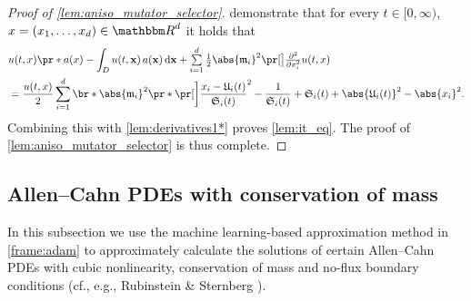 \begin{proof}[Proof of \cref{lem:aniso_mutator_selector}]
	demonstrate that 
		for every
			$t \in [0,\infty)$,
			$x = (x_1, \dots,x_d)\in \R^d$
		it holds that
		\begin{equation}
		\begin{aligned}
			& u(t,x)\pr*{a(x) - \int_{D} u(t,\mathbf{x})\, a(\mathbf{x}) \, \diff\mathbf{x} } + \smallsuml_{i=1}^{d} \tfrac{1}{2} \abs{\mathfrak{m}_i}^2 \bpr{\tfrac{\partial^2 }{\partial x_i^2} u} (t,x) 
			\\ &= 
			\frac{u(t,x)}{2} \sum_{i=1}^d \br*{  \abs{\mathfrak{m}_i}^2  \pr*{ \bbbpr{\frac{x_i - \mathfrak{U}_i(t)}{\mathfrak{S}_i(t)}}^{2} - \frac{1}{\mathfrak{S}_i(t)} } + \mathfrak{S}_i(t) + \abs{\mathfrak{U}_i(t)}^2 - \abs{x_i}^2 }
			.
		\end{aligned}
		\end{equation}
	Combining 
		this 
	with 
		\eqref{lem:derivatives1*} 
	proves \cref{lem:it_eq}. 
	The proof of \cref{lem:aniso_mutator_selector} is thus complete.
\end{proof}

\subsection{Allen--Cahn PDEs with conservation of mass}
\label{subsec:allen_cahn}
%
In this subsection we use the machine learning-based approximation method in \cref{frame:adam}
to approximately calculate the solutions of certain Allen--Cahn PDEs with cubic nonlinearity, conservation of mass and no-flux boundary conditions (cf., e.g., Rubinstein \& Sternberg \cite{RUBINSTEIN1992}).

